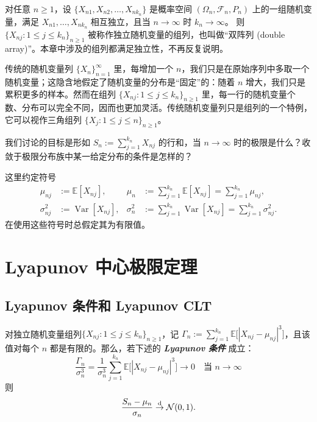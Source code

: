 \begin{definition*}[独立随机变量组列]
对任意 $n\ge1$，设 $\{X_{n1},X_{n2},\dots,X_{nk_n}\}$ 是概率空间
$(\Omega_n,\mathcal F_n,P_n)$ 上的一组随机变量，满足
$X_{n1},\dots,X_{nk_n}$ 相互独立，且当 $n\to\infty$ 时 $k_n\to\infty$。
则 $\{X_{nj}:1\le j\le k_n\}_{n\ge1}$ 被称作独立随机变量的组列，也叫做“双阵列 (double array)”。本章中涉及的组列都满足独立性，不再反复说明。
\end{definition*}

传统的随机变量列 $\{X_n\}_{n=1}^\infty$ 里，每增加一个 $n$，我们只是在原始序列中多取一个随机变量；这隐含地假定了随机变量的分布是“固定”的：随着 $n$ 增大，我们只是累积更多的样本。然而在组列 $\{X_{nj}:1\le j\le k_n\}_{n\ge1}$ 里，每一行的随机变量个数、分布可以完全不同，因而也更加灵活。传统随机变量列只是组列的一个特例，它可以视作三角组列 $\{X_j:1\le j\le n\}_{n\ge1}$。

我们讨论的目标是形如 $S_n:=\sum_{j=1}^{k_n}X_{nj}$ 的行和，当 $n\to\infty$ 时的极限是什么？收敛于极限分布族中某一给定分布的条件是怎样的？

这里约定符号
\[
\begin{aligned}
\mu_{nj}&:=\mathbb E[X_{nj}],
&\mu_n&:=\sum_{j=1}^{k_n}\mathbb E[X_{nj}]=\sum_{j=1}^{k_n}\mu_{nj},\\
\sigma_{nj}^2&:=\operatorname{Var}[X_{nj}],
&\sigma_n^2&:=\sum_{j=1}^{k_n}\operatorname{Var}[X_{nj}]=\sum_{j=1}^{k_n}\sigma_{nj}^2.
\end{aligned}
\]
在使用这些符号时总假定其为有限值。

\section{Lyapunov 中心极限定理}

\subsection{Lyapunov 条件和 Lyapunov CLT}

\begin{theorem}

\label{thm:ch3:3-1}

对独立随机变量组列$\{X_{nj} : 1 \leq j \leq k_n\}_{n \geq 1}$，记 $\Gamma_n := \sum_{j=1}^{k_n} \mathbb{E}\big[|X_{nj} - \mu_{nj}|^3\big]$，且该值对每个 $n$ 都是有限的。那么，若下述的 \textbf{\emph{Lyapunov 条件 }} 成立：
\[\frac{\Gamma_n}{\sigma_n^3} = \frac{1}{\sigma_n^3} \sum_{j=1}^{k_n} \mathbb{E}\big[|X_{nj} - \mu_{nj}|^3\big] \to 0 \quad \text{当 } n \to \infty\]
则
\[
\frac{S_n - \mu_n}{\sigma_n} \overset{\rm d}\to\mathcal N(0, 1).
\]

\end{theorem}

